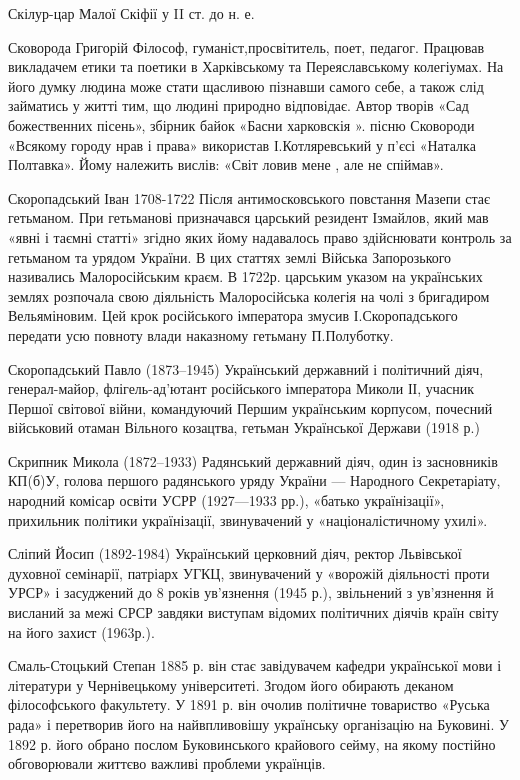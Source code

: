 Скілур-цар Малої Скіфії у II ст. до н. е.

Сковорода Григорій Філософ, гуманіст,просвітитель, поет, педагог. Працював викладачем етики та поетики в Харківському та Переяславському колегіумах. На його думку людина може стати щасливою пізнавши самого себе, а також слід займатись у житті тим, що людині природно відповідає. Автор творів «Сад божественних пісень», збірник байок «Басни харковскія ». пісню Сковороди «Всякому городу нрав і права» використав І.Котляревський у п’єсі «Наталка Полтавка». Йому належить вислів: «Світ ловив мене , але не спіймав».

Скоропадський  Іван 1708-1722 Після антимосковського повстання Мазепи стає гетьманом. При гетьманові призначався царський резидент Ізмайлов, який мав «явні і таємні статті» згідно яких йому надавалось право здійснювати контроль за гетьманом та урядом України. В цих статтях землі Війська Запорозького називались Малоросійським краєм. В 1722р. царським указом на українських землях розпочала свою діяльність Малоросійська колегія на чолі з бригадиром Вельяміновим. Цей крок російського імператора змусив І.Скоропадського передати усю повноту влади наказному гетьману П.Полуботку.

Скоропадський Павло (1873–1945) Український державний і політичний діяч, генерал-майор, флігель-ад’ютант російського імператора Миколи ІІ, учасник Першої світової війни, командуючий Першим українським корпусом, почесний військовий отаман Вільного козацтва, гетьман Української Держави (1918 р.)

Скрипник Микола (1872–1933) Радянський державний діяч, один із засновників КП(б)У, голова першого радянського уряду України — Народного Секретаріату, народний комісар освіти УСРР (1927—1933 рр.), «батько українізації», прихильник політики українізації, звинувачений у «націоналістичному ухилі».

Сліпий Йосип (1892-1984) Український церковний діяч, ректор Львівської духовної семінарії, патріарх УГКЦ, звинувачений у «ворожій діяльності проти УРСР» і засуджений до 8 років ув’язнення (1945 р.), звільнений з ув’язнення й висланий за межі СРСР завдяки виступам відомих політичних діячів країн світу на його захист (1963р.). 

Смаль-Стоцький Степан 1885 р. він стає завідувачем кафедри української мови і літератури у Чернівецькому університеті. Згодом його обирають деканом філософського факультету. У 1891 р. він очолив політичне товариство «Руська рада» і перетворив його на найвпливовішу українську організацію на Буковині. У 1892 р. його обрано послом Буковинського крайового сейму, на якому постійно обговорювали життєво важливі проблеми українців. 

